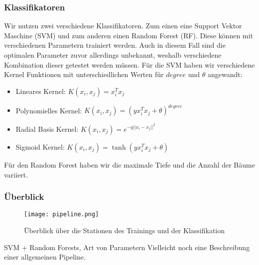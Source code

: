 \subsubsection{Klassifikatoren}
Wir nutzen zwei verschiedene Klassifikatoren. Zum einen eine Support Vektor Maschine (SVM) und zum anderen einen Random Forest (RF).
Diese können mit verschiedenen Parametern trainiert werden. Auch in diesem Fall sind die optimalen Parameter zuvor allerdings unbekannt,
weshalb verschiedene Kombination dieser getestet werden müssen.\newline
Für die SVM haben wir verschiedene Kernel Funktionen mit unterschiedlichen Werten für $degree$ und $\theta$ angewandt:
\begin{itemize}
  \item Lineares Kernel: $K(x_i,x_j) = x_i^Tx_j$
  \item Polynomielles Kernel: $K(x_i,x_j) = (yx_i^Tx_j + \theta)^{degree}$
  \item Radial Basis Kernel: $K(x_i,x_j) = e^{-y||x_i-x_j||^2}$
  \item Sigmoid Kernel: $K(x_i,x_j) = \tanh(yx_i^Tx_j + \theta)$
\end{itemize}

Für den Random Forest haben wir die maximale Tiefe und die Anzahl der Bäume variiert.


\subsubsection{Überblick}
\begin{figure}
\begin{center}
\texttt{[image: pipeline.png]}
\caption{Überblick über die Stationen des Trainings und der Klassifikation}
\end{center}
\label{fig:timediff}
\end{figure}

SVM + Random Forests, Art von Parametern
Vielleicht noch eine Beschreibung einer allgemeinen Pipeline.


